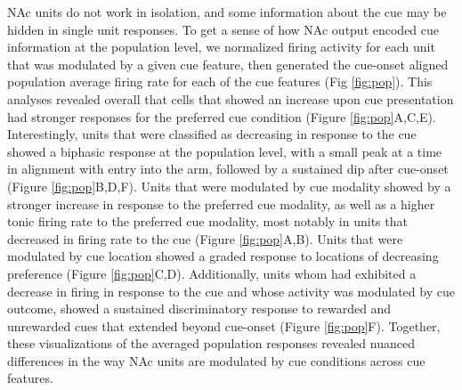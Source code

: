 \documentclass[11pt]{article}
\begin{document}
NAc units do not work in isolation, and some information about the cue may be hidden in single unit responses. To get a sense of how NAc output encoded cue information at the population level, we normalized firing activity for each unit that was modulated by a given cue feature, then generated the cue-onset aligned population average firing rate for each of the cue features (Fig \ref{fig:pop}). This analyses revealed overall that cells that showed an increase upon cue presentation had stronger responses for the preferred cue condition (Figure \ref{fig:pop}A,C,E). Interestingly, units that were classified as decreasing in response to the cue showed a biphasic response at the population level, with a small peak at a time in alignment with entry into the arm, followed by a sustained dip after cue-onset (Figure \ref{fig:pop}B,D,F). Units that were modulated by cue modality showed by a stronger increase in response to the preferred cue modality, as well as a higher tonic firing rate to the preferred cue modality, most notably in units that decreased in firing rate to the cue (Figure \ref{fig:pop}A,B). Units that were modulated by cue location showed a graded response to locations of decreasing preference (Figure \ref{fig:pop}C,D). Additionally, units whom had exhibited a decrease in firing in response to the cue and whose activity was modulated by cue outcome, showed a sustained discriminatory response to rewarded and unrewarded cues that extended beyond cue-onset (Figure \ref{fig:pop}F). Together, these visualizations of the averaged population responses revealed nuanced differences in the way NAc units are modulated by cue conditions across cue features.  
\end{document}

